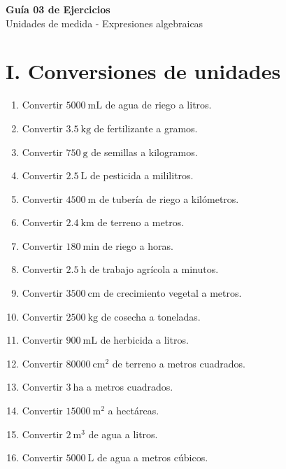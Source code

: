 \documentclass[12pt]{article}
\begin{document}
	
	\vspace*{1em}
	
	\begin{center}
		{\Large \textbf{Guía 03 de Ejercicios}}\\[0.3em]
		{\small Unidades de medida - Expresiones algebraicas}
	\end{center}
	
	\section*{I. Conversiones de unidades}
	
	\begin{enumerate}[itemsep=0.3cm]
		\item Convertir $5000\ \text{mL}$ de agua de riego a litros.
		\item Convertir $3.5\ \text{kg}$ de fertilizante a gramos.
		\item Convertir $750\ \text{g}$ de semillas a kilogramos.
		\item Convertir $2.5\ \text{L}$ de pesticida a mililitros.
		\item Convertir $4500\ \text{m}$ de tubería de riego a kilómetros.
		\item Convertir $2.4\ \text{km}$ de terreno a metros.
		\item Convertir $180\ \text{min}$ de riego a horas.
		\item Convertir $2.5\ \text{h}$ de trabajo agrícola a minutos.
		\item Convertir $3500\ \text{cm}$ de crecimiento vegetal a metros.
		\item Convertir $2500\ \text{kg}$ de cosecha a toneladas.
		\item Convertir $900\ \text{mL}$ de herbicida a litros.
		\item Convertir $80000\ \text{cm}^2$ de terreno a metros cuadrados.
		\item Convertir $3\ \text{ha}$ a metros cuadrados.
		\item Convertir $15000\ \text{m}^2$ a hectáreas.
		\item Convertir $2\ \text{m}^3$ de agua a litros.
		\item Convertir $5000\ \text{L}$ de agua a metros cúbicos.
	\end{enumerate}
	
	\newpage
	
	\textsc{\vspace*{0.5em}}
	
\end{document}
